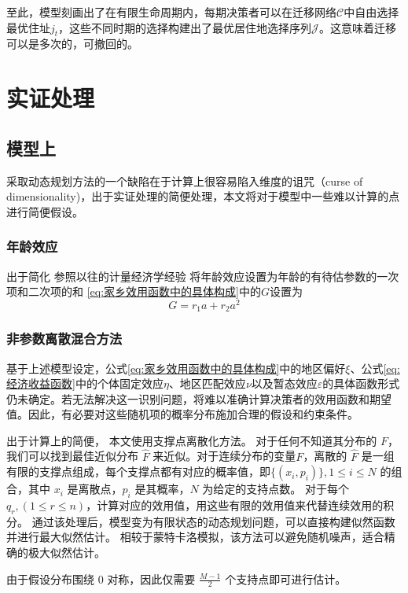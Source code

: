 \documentclass[a4paper,12pt,oneside, fontset=mac]{ctexbook} %
\begin{document}
至此，模型刻画出了在有限生命周期内，每期决策者可以在迁移网络$\mathcal{C}$中自由选择最优住址$j_t$，这些不同时期的选择构建出了最优居住地选择序列$\mathcal{J}$。这意味着迁移可以是多次的，可撤回的。




\chapter{实证处理}

\section{模型上} 

采取动态规划方法的一个缺陷在于计算上很容易陷入维度的诅咒（curse of dimensionality)，出于实证处理的简便处理，本文将对于模型中一些难以计算的点进行简便假设。

\subsection{年龄效应}
出于简化
参照以往的计量经济学经验
将年龄效应设置为年龄的有待估参数的一次项和二次项的和
\ref{eq:家乡效用函数中的具体构成}中的$G$设置为
$$G=r_1 a + r_2 a^2$$


\subsection{非参数离散混合方法} 

基于上述模型设定，公式\ref{eq:家乡效用函数中的具体构成}中的地区偏好$\xi$、公式\ref{eq:经济收益函数}中的个体固定效应$\eta$、地区匹配效应$\nu$以及暂态效应$\varepsilon$的具体函数形式仍未确定。若无法解决这一识别问题，将难以准确计算决策者的效用函数和期望值。因此，有必要对这些随机项的概率分布施加合理的假设和约束条件。

出于计算上的简便，
本文使用支撑点离散化方法。
对于任何不知道其分布的 $F$，我们可以找到最佳近似分布 $\hat F$ 来近似。对于连续分布的变量$F$，离散的 $\hat F$ 是一组有限的支撑点组成，每个支撑点都有对应的概率值，即$\{(x_i, p_i)\}, 1 \leqslant i \leqslant N$ 的组合，其中 $x_i$ 是离散点，$p_i$ 是其概率，$N$ 为给定的支持点数。
对于每个$q_r, (1\leqslant r \leqslant n )$，计算对应的效用值，用这些有限的效用值来代替连续效用的积分。
通过该处理后，模型变为有限状态的动态规划问题，可以直接构建似然函数并进行最大似然估计。
相较于蒙特卡洛模拟，该方法可以避免随机噪声，适合精确的极大似然估计。

由于假设分布围绕 0 对称，因此仅需要 $\frac{M-1}{2}$ 个支持点即可进行估计。
\end{document}
